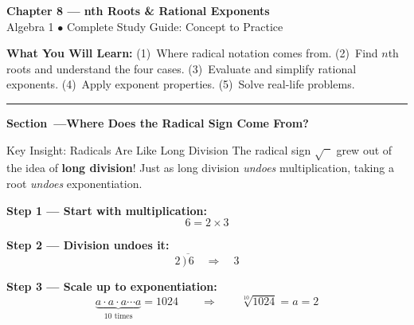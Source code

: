 \documentclass[12pt]{article}
\newcounter{mysec}
\newcommand{\mysection}[1]{%
  \stepcounter{mysec}%
  \vspace{14pt}%
  \noindent
  \begin{tcolorbox}[enhanced,colback=navy,colframe=navy,
    boxrule=0pt,arc=3pt,left=8pt,right=8pt,top=5pt,bottom=5pt,
    before skip=0pt,after skip=10pt]
    \color{white}\bfseries\large Section~\themysec\enspace---\enspace #1
  \end{tcolorbox}}
\begin{document}
\begin{tcolorbox}[enhanced,colback=navy,colframe=navy,arc=6pt,
  left=12pt,right=12pt,top=12pt,bottom=12pt]
  \centering\color{white}
  {\LARGE\bfseries Chapter 8 --- nth Roots \& Rational Exponents}\\[6pt]
  {\large Algebra 1 \quad $\bullet$ \quad Complete Study Guide: Concept to Practice}
\end{tcolorbox}

\vspace{6pt}
\noindent\textbf{What You Will Learn:}\;
(1)~Where radical notation comes from.\;
(2)~Find $n$th roots and understand the four cases.\;
(3)~Evaluate and simplify rational exponents.\;
(4)~Apply exponent properties.\;
(5)~Solve real-life problems.

\vspace{4pt}\hrule\vspace{8pt}

\mysection{Where Does the Radical Sign Come From?}

\begin{insightbox}{Key Insight: Radicals Are Like Long Division}
The radical sign $\sqrt{\phantom{x}}$ grew out of the idea of \textbf{long division}!
Just as long division \textit{undoes} multiplication,
taking a root \textit{undoes} exponentiation.
\end{insightbox}

\noindent\textbf{Step 1 --- Start with multiplication:}
\[
  6 = 2 \times 3
\]

\noindent\textbf{Step 2 --- Division undoes it:}
\[
  2\,\overline{\big)\,6} \quad\Rightarrow\quad 3
\]

\noindent\textbf{Step 3 --- Scale up to exponentiation:}
\[
  \underbrace{a \cdot a \cdot a \cdots a}_{10\text{ times}} = 1024
  \qquad\Longrightarrow\qquad
  \sqrt[10]{1024} = a = 2
\]

\begin{center}
\end{center}
\end{document}
